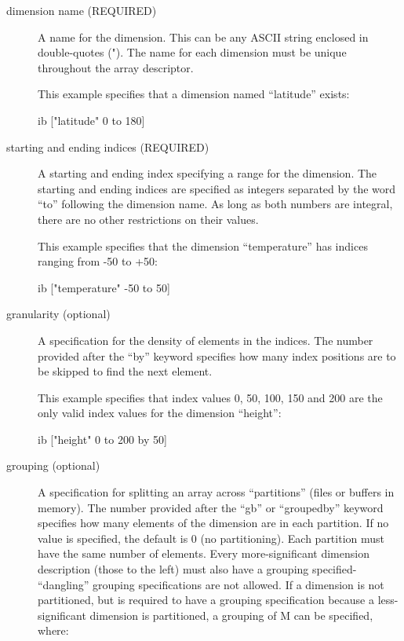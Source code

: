 \begin{description}


\item[dimension name (REQUIRED)]
  
  A name for the dimension. This can be any ASCII string enclosed in
  double-quotes ("). The name for each dimension must be unique
  throughout the array descriptor.
  
  This example specifies that a dimension named ``latitude'' exists:

\begin{vcode}{ib}
["latitude" 0 to 180] 
\end{vcode}

\item[starting and ending indices (REQUIRED)]
  
  A starting and ending index specifying a range for the dimension.
  The starting and ending indices are specified as integers separated
  by the word ``to'' following the dimension name. As long as both
  numbers are integral, there are no other restrictions on their
  values.
  
  This example specifies that the dimension ``temperature'' has
  indices ranging from -50 to +50:

\begin{vcode}{ib}
["temperature" -50 to 50] 
\end{vcode}

\item[granularity (optional)]
  
  A specification for the density of elements in the indices. The
  number provided after the ``by'' keyword specifies how many index
  positions are to be skipped to find the next element.
  
  This example specifies that index values 0, 50, 100, 150 and 200 are
  the only valid index values for the dimension ``height'':

\begin{vcode}{ib}
["height" 0 to 200 by 50] 
\end{vcode}

\item[grouping (optional)]
  
  A specification for splitting an array across ``partitions'' (files
  or buffers in memory). The number provided after the ``gb'' or
  ``groupedby'' keyword specifies how many elements of the dimension
  are in each partition. If no value is specified, the default is 0
  (no partitioning). Each partition must have the same number of
  elements. Every more-significant dimension description (those to the
  left) must also have a grouping specified- ``dangling'' grouping
  specifications are not allowed. If a dimension is not partitioned,
  but is required to have a grouping specification because a
  less-significant dimension is partitioned, a grouping of M can be
  specified, where:


\end{description}
